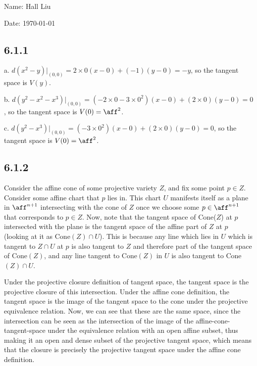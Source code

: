 \documentclass{article}
\begin{document}
Name: Hall Liu

Date: \today 
\vspace{1.5cm}
\subsection*{6.1.1}
a. $d(x^2-y)|_{(0,0)}=2\times0(x-0)+(-1)(y-0)=-y$, so the tangent space is $V(y)$.

b. $d(y^2-x^2-x^3)|_{(0,0)}=(-2\times0-3\times0^2)(x-0)+(2\times0)(y-0)=0$, so the tangent space is $V(0)=\aff^2$.

c. $d(y^2-x^3)|_{(0,0)}=(-3\times0^2)(x-0)+(2\times0)(y-0)=0$, so the tangent space is $V(0)=\aff^2$.
\subsection*{6.1.2}
Consider the affine cone of some projective variety $Z$, and fix some point $p\in Z$. Consider some affine chart that $p$ lies in. This chart $U$ manifests itself as a plane in $\aff^{n+1}$ intersecting with the cone of $Z$ once we choose some $p\in\aff^{n+1}$ that corresponds to $p\in Z$. Now, note that the tangent space of Cone($Z$) at $p$ intersected with the plane is the tangent space of the affine part of $Z$ at $p$ (looking at it as Cone$(Z)\cap U$). This is because any line which lies in $U$ which is tangent to $Z\cap U$ at $p$ is also tangent to $Z$ and therefore part of the tangent space of Cone$(Z)$, and any line tangent to Cone$(Z)$ in $U$ is also tangent to Cone$(Z)\cap U$. 

Under the projective closure definition of tangent space, the tangent space is the projective closure of this intersection. Under the affine cone definition, the tangent space is the image of the tangent space to the cone under the projective equivalence relation. Now, we can see that these are the same space, since the intersection can be seen as the intersection of the image of the affine-cone-tangent-space under the equivalence relation with an open affine subset, thus making it an open and dense subset of the projective tangent space, which means that the closure is precisely the projective tangent space under the affine cone definition.
\end{document}
